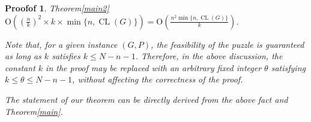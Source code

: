 \documentclass[10pt,a4paper]{amsart}
\newtheorem{Proofof}{Proofof}
\DeclareMathOperator{\CL}{CL}
\newcommand{\Ord}{\mathrm{O}}
\newcommand{\tume}{\hspace*{0.2em}}
\begin{document}
\begin{Proofof}{Theorem\tume\ref{main2}}
$\Ord((\frac{n}{k})^2 \times k \times \min\{n,\CL(G)\})=\Ord(\frac{n^2\min\{n,\CL(G)\}}{k})$.

Note that, for a given instance $(G, P)$, the feasibility of the puzzle is guaranteed as long as 
$k$ satisfies $k \leq N - n - 1$. 
Therefore, in the above discussion, the constant $k$ in the proof may be replaced with an arbitrary 
fixed integer $\theta$ satisfying $k \leq \theta \leq N - n - 1$, without affecting the correctness of the proof.

The statement of our theorem can be directly derived from the above fact and Theorem\tume\ref{main}. 
\end{Proofof}
\end{document}
